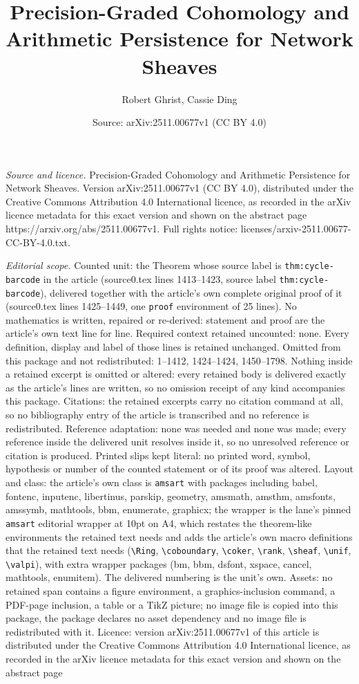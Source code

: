\documentclass[10pt,a4paper]{amsart}
\title[Precision-Graded Cohomology and Arithmetic Persistence for N]{Precision-Graded Cohomology and Arithmetic Persistence for Network Sheaves}
\author{Robert Ghrist, Cassie Ding}
\date{Source: arXiv:2511.00677v1 (CC BY 4.0)}
\begin{document}
\maketitle

\noindent\emph{Source and licence.} Precision-Graded Cohomology and Arithmetic Persistence for Network Sheaves. Version arXiv:2511.00677v1 (CC BY 4.0), distributed under the Creative Commons Attribution 4.0 International licence, as recorded in the arXiv licence metadata for this exact version and shown on the abstract page https://arxiv.org/abs/2511.00677v1. Full rights notice: licenses/arxiv-2511.00677-CC-BY-4.0.txt.\par\smallskip

\noindent\textit{Editorial scope.} Counted unit: the Theorem whose source label is \texttt{thm:cycle-barcode} in the article (source0.tex lines 1413--1423, source label \texttt{thm:cycle-barcode}), delivered together with the article's own complete original proof of it (source0.tex lines 1425--1449, one \texttt{proof} environment of 25 lines). No mathematics is written, repaired or re-derived: statement and proof are the article's own text line for line. Required context retained uncounted: none. Every definition, display and label of those lines is retained unchanged. Omitted from this package and not redistributed: 1--1412, 1424--1424, 1450--1798. Nothing inside a retained excerpt is omitted or altered: every retained body is delivered exactly as the article's lines are written, so no omission receipt of any kind accompanies this package. Citations: the retained excerpts carry no citation command at all, so no bibliography entry of the article is transcribed and no reference is redistributed. Reference adaptation: none was needed and none was made; every reference inside the delivered unit resolves inside it, so no unresolved reference or citation is produced. Printed slips kept literal: no printed word, symbol, hypothesis or number of the counted statement or of its proof was altered. Layout and class: the article's own class is \texttt{amsart} with packages including babel, fontenc, inputenc, libertinus, parskip, geometry, amsmath, amsthm, amsfonts, amssymb, mathtools, bbm, enumerate, graphicx; the wrapper is the lane's pinned \texttt{amsart} editorial wrapper at 10pt on A4, which restates the theorem-like environments the retained text needs and adds the article's own macro definitions that the retained text needs (\texttt{\textbackslash Ring}, \texttt{\textbackslash coboundary}, \texttt{\textbackslash coker}, \texttt{\textbackslash rank}, \texttt{\textbackslash sheaf}, \texttt{\textbackslash unif}, \texttt{\textbackslash valpi}), with extra wrapper packages (bm, bbm, dsfont, xspace, cancel, mathtools, enumitem). The delivered numbering is the unit's own. Assets: no retained span contains a figure environment, a graphics-inclusion command, a PDF-page inclusion, a table or a TikZ picture; no image file is copied into this package, the package declares no asset dependency and no image file is redistributed with it. Licence: version arXiv:2511.00677v1 of this article is distributed under the Creative Commons Attribution 4.0 International licence, as recorded in the arXiv licence metadata for this exact version and shown on the abstract page 
\end{document}

